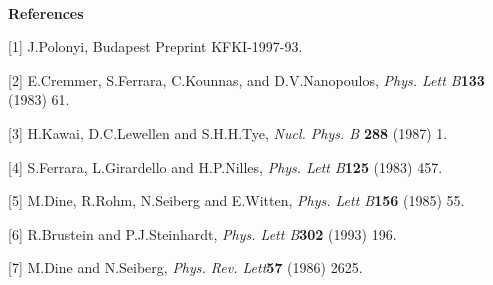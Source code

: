 \documentclass[a4paper,12pt]{article}
\begin{document}
\

\textbf{References}


[1] J.Polonyi, Budapest Preprint KFKI-1997-93.

[2] E.Cremmer, S.Ferrara, C.Kounnas, and D.V.Nanopoulos, {\em
Phys. Lett B\/}{\bf 133} (1983) 61.

[3] H.Kawai, D.C.Lewellen and S.H.H.Tye, {\em Nucl. Phys. B\/}{\bf
288} (1987) 1.

[4] S.Ferrara, L.Girardello and H.P.Nilles, {\em Phys. Lett
B\/}{\bf 125} (1983) 457.

[5] M.Dine, R.Rohm, N.Seiberg and E.Witten, {\em Phys. Lett
B\/}{\bf 156} (1985) 55.

[6] R.Brustein and P.J.Steinhardt, {\em Phys. Lett B\/}{\bf 302}
(1993) 196.

[7] M.Dine and N.Seiberg, {\em Phys. Rev. Lett\/}{\bf 57} (1986)
2625.
\end{document}
